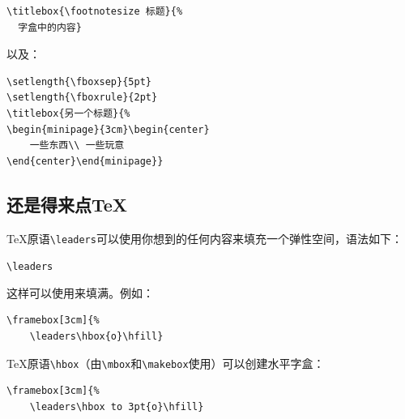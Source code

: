 \begin{codelist}[10.11]{
}\begin{verbatim}
\titlebox{\footnotesize 标题}{%
  字盒中的内容}
\end{verbatim}
\end{codelist}

以及：

\begin{codelist}[10.12]{
    \setlength{\fboxsep}{5pt}
\setlength{\fboxrule}{2pt}
}\begin{verbatim}
\setlength{\fboxsep}{5pt}
\setlength{\fboxrule}{2pt}
\titlebox{另一个标题}{%
\begin{minipage}{3cm}\begin{center} 
    一些东西\\ 一些玩意
\end{center}\end{minipage}}
\end{verbatim}
\end{codelist}

\subsection{还是得来点\TeX}

\TeX 原语\verb|\leaders|可以使用你想到的任何内容来填充一个弹性空间，语法如下：

\begin{dmd}
\verb|\leaders|
\end{dmd}

这样可以使用来填满。例如：

\begin{codelist}[10.13]{
}\begin{verbatim}
\framebox[3cm]{%
    \leaders\hbox{o}\hfill}
\end{verbatim}
\end{codelist}

\TeX 原语\verb|\hbox|（由\verb|\mbox|和\verb|\makebox|使用）可以创建水平字盒：

\begin{codelist}[10.14]{
}\begin{verbatim}
\framebox[3cm]{%
    \leaders\hbox to 3pt{o}\hfill}
\end{verbatim}
\end{codelist}


